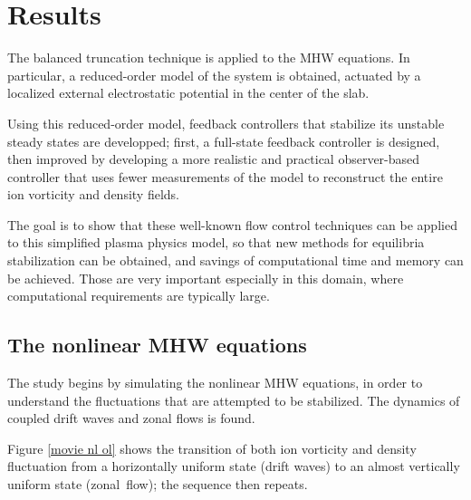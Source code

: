 \documentclass[12pt,lot, lof]{puthesis}
\begin{document}
\section{Results}
\label{Result}

The balanced truncation technique is applied to the MHW equations. In particular, a reduced-order model of the system is obtained, actuated by a localized external electrostatic potential in the center of the slab.

Using this reduced-order model, feedback controllers that stabilize its unstable steady states are developped; first, a full-state feedback controller is designed, then improved by developing a more realistic and practical observer-based controller that uses fewer measurements of the model to reconstruct the entire ion vorticity and density fields. 

The goal is to show that these well-known flow control techniques can be applied to this simplified plasma physics model, so that new methods for equilibria stabilization can be obtained, and savings of computational time and memory can be achieved. Those are very important especially in this domain, where computational requirements are typically large. 


\subsection{The nonlinear MHW equations }

The study begins by simulating the nonlinear MHW equations, in order to understand the fluctuations that are attempted to be stabilized.  The dynamics of coupled drift waves and zonal flows is found.

Figure \ref{movie nl ol} shows the transition of both ion vorticity and density fluctuation from a horizontally uniform state (drift waves) to an almost  vertically uniform state (zonal~flow);  the sequence then repeats.
\end{document}
